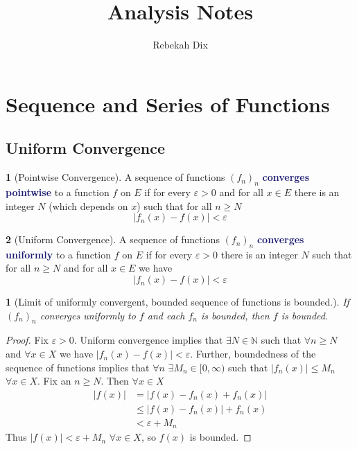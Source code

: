 \documentclass[11pt]{article}
\title{Analysis Notes}
\author{Rebekah Dix}
\numberwithin{equation}{section}
\newcommand{\navy}[1]{\textcolor{MidnightBlue}{\bf #1}}
\theoremstyle{plain}
\newtheorem{theorem}{\color{ForestGreen}{\textbf{Theorem}}}[section]
\theoremstyle{definition}
\newtheorem{definition}{\color{MidnightBlue}{\textbf{Definition}}}[section]
\newcommand{\1}{\mathbbm 1}
\newcommand{\e}{\varepsilon}
\newcommand{\NN}{\mathbb N}
\begin{document}
\maketitle
\tableofcontents
\newpage 

\section{Sequence and Series of Functions}

\subsection{Uniform Convergence}

\begin{definition}[Pointwise Convergence]
	A sequence of functions $(f_n)_n$ \navy{converges pointwise} to a function $f$ on $E$ if for every $\e > 0$ and for all $x \in E$ there is an integer $N$ (which depends on $x$) such that for all $n \geq N$
	\begin{equation*}
		|f_n(x) - f(x)| < \e
	\end{equation*}
\end{definition}

\begin{definition}[Uniform Convergence]
	A sequence of functions $(f_n)_n$ \navy{converges uniformly} to a function $f$ on $E$ if for every $\e > 0$ there is an integer $N$ such that for all $n \geq N$ and for all $x \in E$ we have
	\begin{equation*}
		|f_n(x) - f(x)| < \e
	\end{equation*}
\end{definition}

\begin{theorem}[Limit of uniformly convergent, bounded sequence of functions is bounded.]
	If $(f_n)_n$ converges uniformly to $f$ and each $f_n$ is bounded, then $f$ is bounded. 
\end{theorem}
\begin{proof}
	Fix $\e > 0$. Uniform convergence implies that $\exists N \in \NN$ such that $\forall n \geq N$ and $\forall x \in X$ we have $|f_n(x) - f(x)| < \e$. Further, boundedness of the sequence of functions implies that $\forall n$ $\exists M_n \in [0,\infty)$ such that $|f_n(x)| \leq M_n$ $\forall x \in X$. Fix an $n \geq N$. Then $\forall x \in X$
	\begin{align*}
		|f(x)| &= |f(x) - f_n(x) + f_n(x)| \\
		&\leq |f(x) - f_n(x)| + f_n(x) \tag{trianlge inequality} \\
		& < \e + M_n \tag{uniform convergence and boundedness}
	\end{align*}
	Thus $|f(x)| < \e + M_n$ $\forall x \in X$, so $f(x)$ is bounded.
\end{proof}
\end{document}
